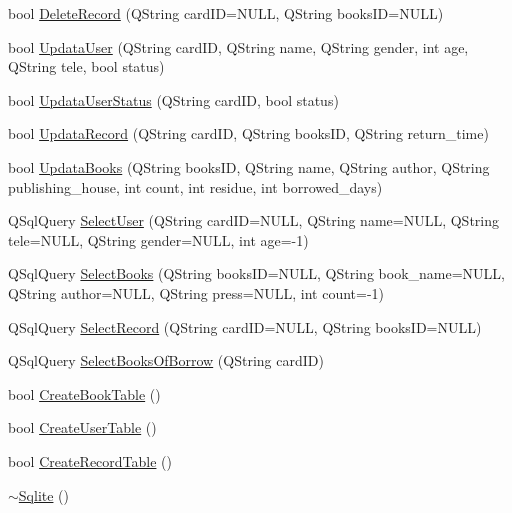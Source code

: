 \begin{DoxyCompactItemize}
\item 
bool \mbox{\hyperlink{class_sqlite_aa120de86db20f42a61a5c2eae9ad6b89}{Delete\+Record}} (Q\+String card\+ID=N\+U\+LL, Q\+String books\+ID=N\+U\+LL)
\item 
bool \mbox{\hyperlink{class_sqlite_a7909130f3bbef819bd808c49c9249e2c}{Updata\+User}} (Q\+String card\+ID, Q\+String name, Q\+String gender, int age, Q\+String tele, bool status)
\item 
bool \mbox{\hyperlink{class_sqlite_a9827a7be15c19a7ecc943b701baa932b}{Updata\+User\+Status}} (Q\+String card\+ID, bool status)
\item 
bool \mbox{\hyperlink{class_sqlite_a5cb753f7b603cc450ef9527bf96d51f1}{Updata\+Record}} (Q\+String card\+ID, Q\+String books\+ID, Q\+String return\+\_\+time)
\item 
bool \mbox{\hyperlink{class_sqlite_a6fc03a68c321e300dc540d0a48eabc70}{Updata\+Books}} (Q\+String books\+ID, Q\+String name, Q\+String author, Q\+String publishing\+\_\+house, int count, int residue, int borrowed\+\_\+days)
\item 
Q\+Sql\+Query \mbox{\hyperlink{class_sqlite_aa540de99093cdea8160088a2c69872ee}{Select\+User}} (Q\+String card\+ID=N\+U\+LL, Q\+String name=N\+U\+LL, Q\+String tele=N\+U\+LL, Q\+String gender=N\+U\+LL, int age=-\/1)
\item 
Q\+Sql\+Query \mbox{\hyperlink{class_sqlite_a045a181307b20222cd5a6c6f5f428281}{Select\+Books}} (Q\+String books\+ID=N\+U\+LL, Q\+String book\+\_\+name=N\+U\+LL, Q\+String author=N\+U\+LL, Q\+String press=N\+U\+LL, int count=-\/1)
\item 
Q\+Sql\+Query \mbox{\hyperlink{class_sqlite_a3c012aa302538385ce05d0b0371a9860}{Select\+Record}} (Q\+String card\+ID=N\+U\+LL, Q\+String books\+ID=N\+U\+LL)
\item 
Q\+Sql\+Query \mbox{\hyperlink{class_sqlite_ab9e451e38960661c5a493948453b63c7}{Select\+Books\+Of\+Borrow}} (Q\+String card\+ID)
\item 
bool \mbox{\hyperlink{class_sqlite_a2c8180569a048b3e69abd84a044caec6}{Create\+Book\+Table}} ()
\item 
bool \mbox{\hyperlink{class_sqlite_aa0840501ef42abf7fff8efc064caae01}{Create\+User\+Table}} ()
\item 
bool \mbox{\hyperlink{class_sqlite_ae84aab901a62d1876dcfca3f190af12c}{Create\+Record\+Table}} ()
\item 
\mbox{\hyperlink{class_sqlite_adc35a543dca91edc3ffb90a3825dd54a}{$\sim$\+Sqlite}} ()
\end{DoxyCompactItemize}
